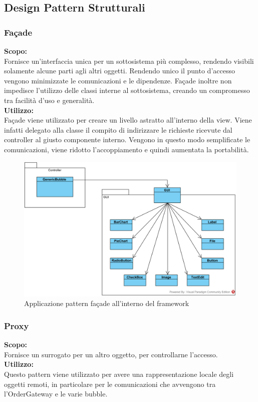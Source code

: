 \subsection{Design Pattern Strutturali}

\subsubsection{Fa\c{c}ade}
\textbf{Scopo:} \\
Fornisce un'interfaccia unica per un sottosistema più complesso, rendendo visibili solamente alcune parti agli altri oggetti. Rendendo unico il punto d'accesso vengono minimizzate le comunicazioni e le dipendenze. Fa\c{c}ade inoltre non impedisce l'utilizzo delle classi interne al sottosistema, creando un compromesso tra facilità d'uso e generalità. \\
\textbf{Utilizzo:} \\ 
Fa\c{c}ade viene utilizzato per creare un livello astratto all'interno della view. Viene infatti delegato alla classe  il compito di indirizzare le richieste ricevute dal controller al giusto componente interno. Vengono in questo modo semplificate le comunicazioni, viene ridotto l'accoppiamento e quindi aumentata la portabilità.

\begin{figure}[H]
	\centering
	\includegraphics[width=15cm]{./diagrammi_img/applicazione_pattern/facade_framework.png}
	\caption{Applicazione pattern fa\c{c}ade all'interno del framework}
\end{figure}

\subsubsection{Proxy}
\textbf{Scopo:}\\
Fornisce un surrogato per un altro oggetto, per controllarne l'accesso.\\
\textbf{Utilizzo:}\\
Questo pattern viene utilizzato per avere una rappresentazione locale degli oggetti remoti, in particolare per le comunicazioni che avvengono tra l'OrderGateway e le varie bubble.

